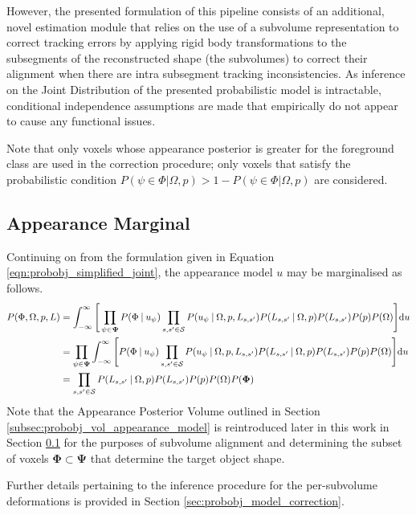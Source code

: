 However, the presented formulation of this pipeline consists of an
additional, novel estimation module that relies on the use of a subvolume
representation to correct tracking errors by applying rigid body transformations
to the subsegments of the reconstructed shape (the subvolumes) to correct their
alignment when there are intra subsegment tracking inconsistencies. As inference
on the Joint Distribution of the presented probabilistic model is intractable, 
conditional independence assumptions are made that empirically do not appear to 
cause any functional issues. 

Note that only voxels whose appearance posterior is greater for the foreground 
class are used in the correction procedure; only voxels that satisfy the probabilistic 
condition $P(\psi \in \Phi | \Omega, p) > 1 - P(\psi \in \Phi | \Omega, p)$ are 
considered.

\subsection{Appearance Marginal}
Continuing on from the formulation given in Equation \ref{eqn:probobj_simplified_joint}, 
the appearance model $u$ may be marginalised as follows.
\begin{align}
  \label{eqn:probobj_appearance_marginal}
  P(\Phi, \Omega, p, L) & =
  \int_{-\infty}^{\infty} \Bigg[ 
  \prod_{\psi \in \mathbf{\Psi}} P(\Phi \:\vert\: u_{\psi})
  \prod_{s, s' \in \mathcal{S}}P(u_{\psi} \:\vert\: \Omega, p, L_{s, s'})
  P(L_{s, s'} \:\vert\: \Omega, p) P(L_{s, s'})P(p)P(\Omega) \Bigg] {\mathrm d{u}} \\
  & = \prod_{\psi \in \mathbf{\Psi}} 
  \int_{-\infty}^{\infty} \Bigg[ P(\Phi \:\vert\: u_{\psi})
  \prod_{s, s' \in \mathcal{S}}P(u_{\psi} \:\vert\: \Omega, p, L_{s, s'})
  P(L_{s, s'} \:\vert\: \Omega, p) P(L_{s, s'})P(p)P(\Omega) \Bigg] {\mathrm d{u}} \\
  & = \prod_{s, s' \in \mathcal{S}} P(L_{s, s'} \:\vert\: \Omega, p)
  P(L_{s, s'})P(p)P(\Omega)P(\mathbf{\Phi})
\end{align}
Note that the Appearance Posterior Volume outlined in Section 
\ref{subsec:probobj_vol_appearance_model} is reintroduced later in this work in
Section \ref{} for the purposes of subvolume alignment and determining the
subset of voxels $\mathbf{\Phi} \subset \mathbf{\Psi}$ that determine the target
object shape.

Further details pertaining to the inference procedure for the per-subvolume
deformations is provided in Section \ref{sec:probobj_model_correction}.

